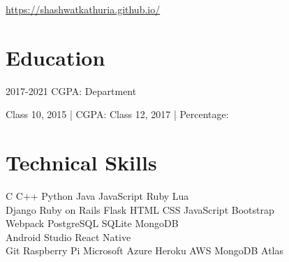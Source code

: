 \documentclass[]{deedy-resume-openfont}
\begin{document}
%
%

%
%


\url{https://shashwatkathuria.github.io/}

%
%

\section{Education}
\begin{large}
    2017-2021
	\textbullet{}
    CGPA: 
    \textbullet{}
    Department 
\end{large}
\sectionsep

\begin{large}
    Class 10, 2015 | CGPA: 
    \textbullet{}
    Class 12, 2017 | Percentage: 
\end{large}
\sectionsep

%
%

\section{Technical Skills}
\begin{large}
 C \textbullet{}   C++ \textbullet{} Python \textbullet{} Java \textbullet{}
JavaScript \textbullet{} Ruby \textbullet{} Lua \\

 Django \textbullet{} Ruby on Rails \textbullet{} Flask \textbullet{}
 HTML \textbullet{} CSS \textbullet{} JavaScript \textbullet{} Bootstrap \\ \hspace{36mm} \textbullet{} Webpack \textbullet{} PostgreSQL \textbullet{} SQLite \textbullet{} MongoDB \\

 Android Studio \textbullet{} React Native \\

 Git \textbullet{} Raspberry Pi \textbullet{} Microsoft Azure \textbullet{} Heroku \textbullet{} AWS \textbullet{} MongoDB Atlas \\

\end{large}
\sectionsep
\end{document}
